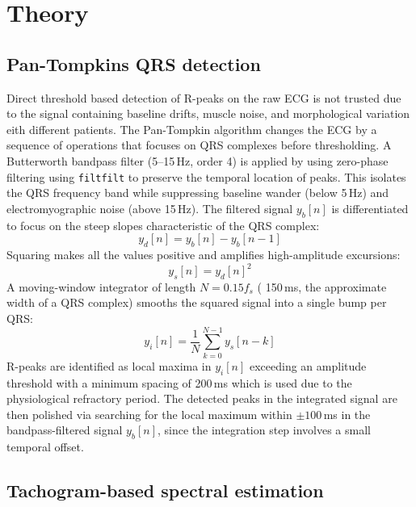 \documentclass[11pt,a4paper]{article}
\begin{document}
\section{Theory}

\subsection{Pan-Tompkins QRS detection}
Direct threshold based detection of R-peaks on the raw ECG is not trusted due to the signal containing baseline drifts, muscle noise, and morphological variation eith different patients. The Pan-Tompkin algorithm changes the ECG by a sequence of operations that focuses on QRS complexes before thresholding.
A Butterworth bandpass filter (5--15\,Hz, order 4) is applied by using zero-phase
filtering using \texttt{filtfilt} to preserve the temporal location of peaks.
This isolates the QRS frequency band while suppressing baseline wander (below
5\,Hz) and electromyographic noise (above 15\,Hz).
The filtered signal $y_b[n]$ is differentiated to focus on the steep slopes
characteristic of the QRS complex:
\begin{equation}
    y_d[n] = y_b[n] - y_b[n-1]
\end{equation}
Squaring makes all the values positive and amplifies high-amplitude excursions:
\begin{equation}
    y_s[n] = y_d[n]^2
\end{equation}
A moving-window integrator of length $N = 0.15 f_s$ ( 150\,ms, the
approximate width of a QRS complex) smooths the squared signal into a
single bump per QRS:
\begin{equation}
    y_i[n] = \frac{1}{N} \sum_{k=0}^{N-1} y_s[n-k]
\end{equation}
R-peaks are identified as local maxima in $y_i[n]$ exceeding an amplitude threshold with a minimum spacing of 200\,ms which is used due to the physiological refractory period. The detected peaks in the integrated signal are then polished via searching for the local maximum within $\pm 100$\,ms in the bandpass-filtered signal $y_b[n]$, since the integration step involves a small temporal offset.

\subsection{Tachogram-based spectral estimation}
\end{document}
